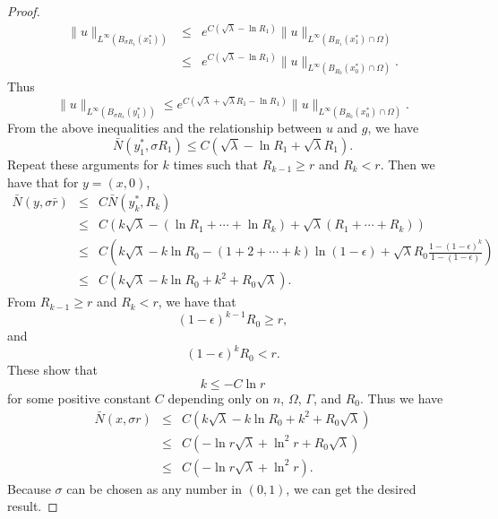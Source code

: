 \documentclass[a4paper, 12pt, onecolumn]{article} \textwidth 148mm
\begin{document}
\begin{proof}
\begin{eqnarray*}
\|u\|_{L^{\infty}(B_{\sigma R_1}(x^*_1))}&\leq&e^{C(\sqrt{\lambda}-\ln R_1)}\|u\|_{L^{\infty}(B_{R_1}(x^*_1)\cap\Omega)}\\&\leq&
e^{C(\sqrt{\lambda}-\ln R_1)}\|u\|_{L^{\infty}(B_{R_0}(x^*_0)\cap\Omega)}.
\end{eqnarray*}
Thus
\begin{equation*}
\|u\|_{L^{\infty}(B_{\sigma R_1}(y^*_1))}\leq e^{C(\sqrt{\lambda}+\sqrt{\lambda}R_1-\ln R_1)}\|u\|_{L^{\infty}(B_{R_0}(x^*_0)\cap\Omega)}.
\end{equation*}
From the above inequalities and the relationship between $u$ and $g$, we have
\begin{equation*}
\bar{N}(y^*_1,\sigma R_1)\leq C(\sqrt{\lambda}-\ln R_1+\sqrt{\lambda}R_1).
\end{equation*}
Repeat these arguments for $k$ times such that $R_{k-1}\geq r$ and $R_{k}<r$. Then  we have that for $y=(x,0)$,
\begin{eqnarray*}
\bar{N}(y,\sigma\bar{r})&\leq&C\bar{N}(y^*_k,R_k)\\&\leq&C(k\sqrt{\lambda}-(\ln R_1+\cdots+\ln R_k)+\sqrt{\lambda}(R_1+\cdots+R_k))
\\&\leq&C\left(k\sqrt{\lambda}-k\ln R_0-(1+2+\cdots+k)\ln(1-\epsilon)+\sqrt{\lambda}R_0\frac{1-(1-\epsilon)^k}{1-(1-\epsilon)}\right)
\\&\leq&C(k\sqrt{\lambda}-k\ln R_0+k^2+R_0\sqrt{\lambda}).
\end{eqnarray*}
From $R_{k-1}\geq r$ and $R_{k}<r$, we have that
\begin{equation*}
(1-\epsilon)^{k-1}R_0\geq r,
\end{equation*}
and
\begin{equation*}
(1-\epsilon)^kR_0<r.
\end{equation*}
These show that
\begin{equation*}
k\leq -C\ln r
\end{equation*}
for some positive constant $C$ depending only on $n$, $\Omega$, $\Gamma$, and $R_0$.
Thus we have
\begin{eqnarray*}
\bar{N}(x,\sigma r)&\leq&C(k\sqrt{\lambda}-k\ln R_0+k^2+R_0\sqrt{\lambda})
\\&\leq&C(-\ln r\sqrt{\lambda}+\ln^2 r+R_0\sqrt{\lambda})
\\&\leq&C(-\ln r\sqrt{\lambda}+\ln^2r).
\end{eqnarray*}
Because $\sigma$ can be chosen as any number in $(0,1)$, we can get the desired result.
\end{proof}
\end{document}
